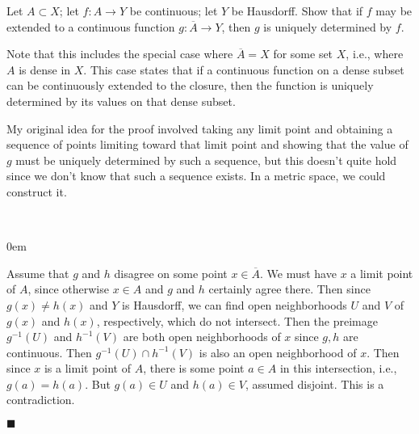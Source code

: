 \documentclass[12pt]{article}
\renewcommand{\qed}{\hfill$\blacksquare$}
\renewenvironment{proof}{\begin{addmargin}[1em]{0em}\begin{newproof}}{\end{newproof}\end{addmargin}\qed}
\newenvironment{problem}[2][Exercise]{\begin{trivlist}
\item[\hskip \labelsep {\bfseries #1}\hskip \labelsep {\bfseries #2.}]}{\end{trivlist}}
\begin{document}
\begin{problem}{18.13}
Let $A\subset X$; let $f:A\rightarrow Y$ be continuous; let $Y$ be Hausdorff. Show that if $f$ may be extended to a continuous function $g:\overline{A}\rightarrow Y$, then $g$ is uniquely determined by $f$.
\end{problem}
{\color{red}Note that this includes the special case where $\overline{A}=X$ for some set $X$, i.e., where $A$ is dense in $X$. This case states that if a continuous function on a dense subset can be continuously extended to the closure, then the function is uniquely determined by its values on that dense subset.

My original idea for the proof involved taking any limit point and obtaining a sequence of points limiting toward that limit point and showing that the value of $g$ must be uniquely determined by such a sequence, but this doesn't quite hold since we don't know that such a sequence exists. In a metric space, we could construct it.}\\

\begin{proof}
	Assume that $g$ and $h$ disagree on some point $x \in \overline{A}$. We must have $x$ a limit point of $A$, since otherwise $x\in A$ and $g$ and $h$ certainly agree there. Then since $g\left(x\right)\neq h\left(x\right)$ and $Y$ is Hausdorff, we can find open neighborhoods $U$ and $V$ of $g\left(x\right)$ and $h\left(x\right)$, respectively, which do not intersect. Then the preimage $g^{-1}\left(U\right)$ and $h^{-1}\left(V\right)$ are both open neighborhoods of $x$ since $g,h$ are continuous. Then $g^{-1}\left(U\right)\cap h^{-1}\left(V\right)$ is also an open neighborhood of $x$. Then since $x$ is a limit point of $A$, there is some point $a\in A$ in this intersection, i.e., $g\left(a\right)=h\left(a\right)$. But $g\left(a\right) \in U$ and $h\left(a\right) \in V$, assumed disjoint. This is a contradiction.
\end{proof}\\
\end{document}

